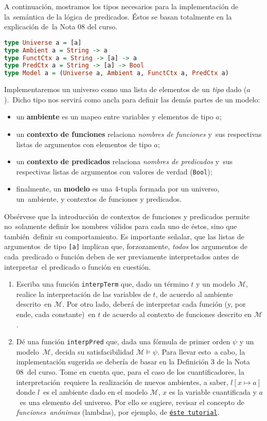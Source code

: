 \documentclass[paper=letter, fontsize=12pt]{scrartcl}
\begin{document}
\noindent
A continuación, mostramos los tipos necesarios para la implementación de la\
semántica de la lógica de predicados. Éstos se basan totalmente en la explicación de\
la Nota 08 del curso.
\begin{lstlisting}[language=Haskell]
type Universe a = [a]
type Ambient a = String -> a
type FunctCtx a = String -> [a] -> a
type PredCtx a = String -> [a] -> Bool
type Model a = (Universe a, Ambient a, FunctCtx a, PredCtx a)
\end{lstlisting}
Implementaremos un universo como una lista de elementos de un \emph{tipo} dado ($a$).\
Dicho tipo nos servirá como ancla para definir las demás partes de un modelo:
\begin{itemize}
\item un \textbf{ambiente} es un mapeo entre variables y elementos de tipo $a$;
\item un \textbf{contexto de funciones} relaciona \emph{nombres de funciones} y\
  sus respectivas listas de argumentos con elementos de tipo $a$;
\item un \textbf{contexto de predicados} relaciona \emph{nombres de predicados} y\
  sus respectivas listas de argumentos con valores de verdad (\verb+Bool+);
\item finalmente, un \textbf{modelo} es una 4-tupla formada por un universo, un\
  ambiente, y contextos de funciones y predicados.
\end{itemize}
Obsérvese que la introducción de contextos de funciones y predicados permite no\
solamente definir los nombres válidos para cada uno de éstos, sino que también\
definir su comportamiento. Es importante señalar, que las listas de argumentos\
de tipo \verb+[a]+ implican que, forzozamente, \emph{todos} los argumentos de cada\
predicado o función deben de ser previamente interpretados antes de interpretar\
el predicado o función en cuestión.

\begin{enumerate}[resume]
\item Escriba una función \verb+interpTerm+ que, dado un término $t$ y un modelo $\mathcal{M}$,
  realice la interpretación de las variables de $t$, de acuerdo al ambiente descrito\
  en $\mathcal{M}$. Por otro lado, deberá de interpretar cada función (y, por ende, cada constante)\
  en $t$ de acuerdo al contexto de funciones descrito en $\mathcal{M}$.
\item Dé una función \verb+interpPred+ que, dada una fórmula de primer orden $\psi$ y un modelo\
  $\mathcal{M}$, decida su satisfacibilidad $\mathcal{M} \models \psi$. Para llevar esto\
  a cabo, la implementación sugerida se debería de basar en la Definición 3 de la Nota 08\
  del curso. Tome en cuenta que, para el caso de los cuantificadores, la interpretación\
  requiere la realización de nuevos ambientes, a saber, $l[x \mapsto a]$ donde $l$\
  es el ambiente dado en el modelo $\mathcal{M}$, $x$ es la variable cuantificada y $a$\
  es una elemento del universo. Por ello se sugiere, revisar el concepto de \emph{funciones}\
  \emph{anónimas} (lambdas), por ejemplo, de \href{http://learnyouahaskell.com/higher-order-functions#lambdas}{\texttt{éste tutorial}}.
\end{enumerate}
\end{document}

